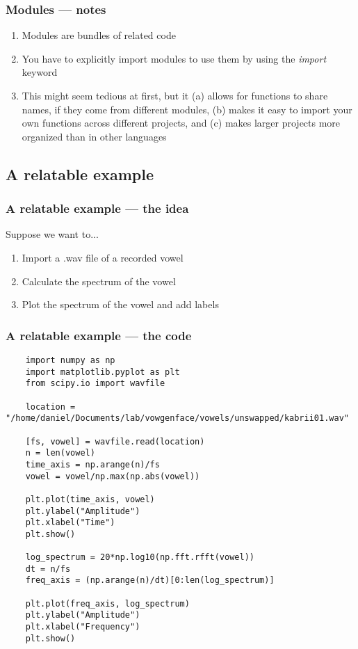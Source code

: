 \documentclass{beamer}
\begin{document}
\begin{frame}
\frametitle{Modules --- notes}
	\begin{enumerate}
		\item Modules are bundles of related code

		\item You have to explicitly import modules to use them by using the \emph{import} keyword

		\item This might seem tedious at first, but it (a) allows for functions to share names, if they come from different modules, (b) makes it easy to import your own functions across different projects, and (c) makes larger projects more organized than in other languages 
	\end{enumerate}
\end{frame}

\subsection{A relatable example}

\begin{frame}
\frametitle{A relatable example --- the idea}
Suppose we want to...
	\begin{enumerate}
		\item Import a .wav file of a recorded vowel 

		\item Calculate the spectrum of the vowel 

		\item Plot the spectrum of the vowel and add labels
	\end{enumerate}
\end{frame}

\begin{frame}[fragile]
\frametitle{A relatable example --- the code}
\begin{lstlisting}
	import numpy as np
	import matplotlib.pyplot as plt
	from scipy.io import wavfile

	location = "/home/daniel/Documents/lab/vowgenface/vowels/unswapped/kabrii01.wav"

	[fs, vowel] = wavfile.read(location) 
	n = len(vowel)
	time_axis = np.arange(n)/fs
	vowel = vowel/np.max(np.abs(vowel))

	plt.plot(time_axis, vowel)
	plt.ylabel("Amplitude")
	plt.xlabel("Time")
	plt.show()

	log_spectrum = 20*np.log10(np.fft.rfft(vowel))
	dt = n/fs
	freq_axis = (np.arange(n)/dt)[0:len(log_spectrum)]

	plt.plot(freq_axis, log_spectrum)
	plt.ylabel("Amplitude")
	plt.xlabel("Frequency")
	plt.show()
\end{lstlisting}
\end{frame}
\end{document}
